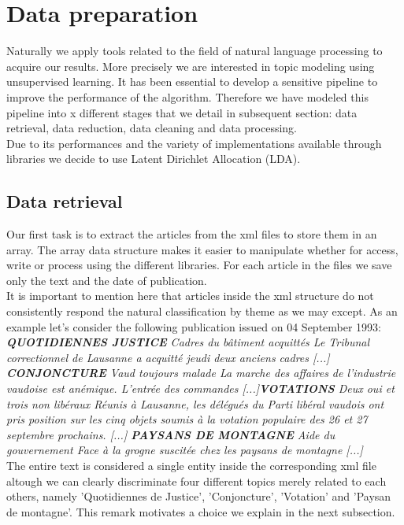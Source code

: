 \documentclass[11pt]{article}
\begin{document}
\section{Data preparation}

Naturally we apply tools related to the field of natural language processing to acquire our results. More
precisely we are interested in topic modeling using unsupervised learning. It has been essential to develop
a sensitive pipeline to improve the performance of the algorithm. Therefore we have modeled this pipeline into x different stages that we detail in subsequent section: data retrieval, data reduction, data cleaning and data processing.
\\
Due to its performances and the variety of implementations available through libraries we decide to use Latent Dirichlet Allocation (LDA). 
\subsection{Data retrieval}

Our first task is to extract the articles from the xml files to store them in an array. The array data structure makes it easier to manipulate whether for access, write or process using the different
libraries. For each article in the files we save only the text and the date of publication.\\
It is important to mention here that articles inside the xml structure do not consistently respond the natural classification by theme as we may except. As an example let's consider the following publication issued on 04 September 1993:\\

\textit{\textbf{QUOTIDIENNES JUSTICE} Cadres du bâtiment acquittés Le Tribunal correctionnel de Lausanne a acquitté jeudi deux anciens cadres [...] \textbf{CONJONCTURE} Vaud toujours malade La marche des affaires de l'industrie vaudoise est anémique. L'entrée des commandes [...]\textbf{VOTATIONS} Deux oui et trois non libéraux Réunis à Lausanne, les délégués du Parti libéral vaudois ont pris position sur les cinq objets soumis à la votation populaire des 26 et 27 septembre prochains. [...] \textbf{PAYSANS DE MONTAGNE} Aide du gouvernement Face à la grogne suscitée chez les paysans de montagne [...]}\\

The entire text is considered a single entity inside the corresponding xml file altough we can clearly discriminate four different topics merely related to each others, namely 'Quotidiennes de Justice', 'Conjoncture', 'Votation' and 'Paysan de montagne'. This remark motivates a choice we explain in the next subsection.
\end{document}

